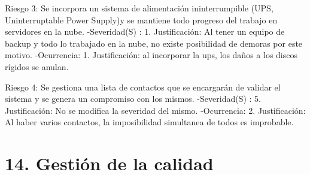 \documentclass[
11pt, %
]{charter}
\begin{document}
Riesgo 3: Se incorpora un sistema de alimentación ininterrumpible (UPS,  Uninterruptable Power Supply)y se mantiene todo progreso del trabajo en servidores en la nube. 
\newline
-Severidad(S) : 1.\newline
Justificación: Al tener un equipo de backup y todo lo trabajado en la nube, no existe posibilidad de demoras por este motivo.\newline
-Ocurrencia: 1.\newline
Justificación: al incorporar la ups, los daños a los discos rígidos se anulan.\newline
 
Riesgo 4: Se gestiona una lista de contactos que se encargarán de validar el sistema y se genera un compromiso con los mismos.
\newline
-Severidad(S) : 5.\newline
Justificación: No se modifica la severidad del mismo.
\newline
-Ocurrencia: 2.\newline
Justificación: Al haber varios contactos, la imposibilidad simultanea de todos es improbable.\newline







\section{14. Gestión de la calidad}
\label{sec:calidad}
\end{document}
